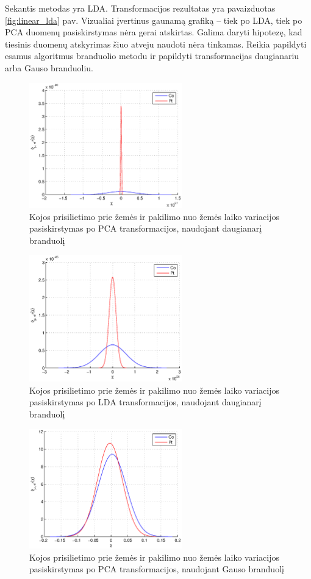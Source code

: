 \documentclass[]{vgtuef}
\begin{document}
Sekantis metodas yra LDA. Transformacijos rezultatas yra pavaizduotas \ref{fig:linear_lda} pav. Vizualiai įvertinus gaunamą grafiką -- tiek po LDA, tiek po PCA duomenų pasiskirstymas nėra gerai atskirtas. Galima daryti hipotezę, kad tiesinis duomenų atskyrimas šiuo atveju naudoti nėra tinkamas. Reikia papildyti esamus algoritmus branduolio metodu ir papildyti transformacijas daugianariu arba Gauso branduoliu.

\begin{figure}[!t]
  \centering
  \includegraphics[width=250px]{figures/st_sw_poly_kpca.eps}
  \caption{Kojos prisilietimo prie žemės ir pakilimo nuo žemės laiko variacijos pasiskirstymas po PCA transformacijos, naudojant daugianarį branduolį}
  \label{fig:poly_pca}
\end{figure}

\begin{figure}[!t]
  \centering
  \includegraphics[width=250px]{figures/st_sw_poly_gda.eps}
  \caption{Kojos prisilietimo prie žemės ir pakilimo nuo žemės laiko variacijos pasiskirstymas po LDA transformacijos, naudojant daugianarį branduolį}
  \label{fig:poly_lda}
\end{figure}

\begin{figure}[!t]
  \centering
  \includegraphics[width=250px]{figures/st_sw_gauss_kpca.eps}
  \caption{Kojos prisilietimo prie žemės ir pakilimo nuo žemės laiko variacijos pasiskirstymas po PCA transformacijos, naudojant Gauso branduolį}
  \label{fig:gauss_pca}
\end{figure}
\end{document}

